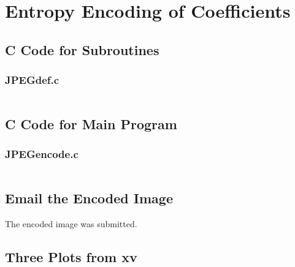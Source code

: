 \documentclass{article}
\begin{document}

\section{Entropy Encoding of Coefficients}
	\subsection{C Code for Subroutines}
		\subsubsection{JPEGdef.c}
			\inputminted[tabsize=2]{c}{../source/jpeg/JPEGdefs.c}
	\subsection{C Code for Main Program}
		\subsubsection{JPEGencode.c}
			\inputminted[tabsize=2]{c}{../source/jpeg/JPEG_encode.c}
	\subsection{Email the Encoded Image}
		The encoded image was submitted.
	\subsection{Three Plots from xv}
\end{document}
